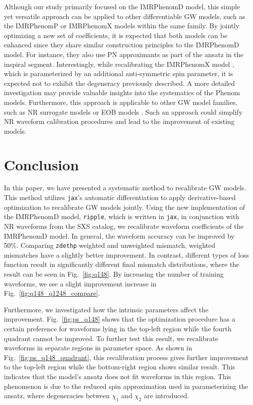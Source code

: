 \documentclass[twocolumn]{aastex631}
\newcommand{\ripple}{\texttt{ripple}}
\newcommand{\jax}{\texttt{jax}}
\newcommand{\zdethp}{\texttt{zdethp}}
\begin{document}
Although our study primarily focused on the IMRPhenomD model, this simple yet
versatile approach can be applied to other differentiable GW models, such as the
IMRPhenomP \citep{hannam2014simple} or IMRPhenomX \citep{pratten2020setting} 
models within the same family. By jointly optimizing a new set of coefficients,
it is expected that both models can be enhanced since they share similar
construction principles to the IMRPhenomD model. For instance, they also use PN
approximants as part of the ansatz in the inspiral segment. Interestingly, while
recalibrating the IMRPhenomX model \citep{pratten2020setting}, which is
parameterized by an additional anti-symmetric spin parameter, it is expected not
to exhibit the degeneracy previously described. A more detailed investigation
may provide valuable insights into the systematics of the Phenom models.
Furthermore, this approach is applicable to other GW model families, such as NR
surrogate models \citep{varma2019surrogate} or EOB models
\citep{taracchini2014effective}. Such an approach could simplify NR waveform
calibration procedures and lead to the improvement of existing models.


\section{Conclusion} \label{sec:conclusion}

In this paper, we have presented a systematic method to recalibrate GW models.
This method utilizes {\jax}'s automatic differentiation to apply
derivative-based optimization to recalibrate GW models jointly. Using the new
implementation of the IMRPhenomD model, {\ripple}, which is written in \jax, in
conjunction with NR waveforms from the SXS catalog, we recalibrate waveform
coefficients of the IMRPhenomD model. In general, the waveform accuracy can be
improved by 50\%. Comparing {\zdethp} weighted and unweighted mismatch, weighted
mismatches have a slightly better improvement. In contrast, different types of
loss function result in significantly different final mismatch distributions,
where the result can be seen in Fig.~\ref{fig:q148}. By increasing the number of
training waveforms, we see a slight improvement increase in
Fig.~\ref{fig:q148_q1248_compare}. 

Furthermore, we investigated how the intrinsic parameters affect the
improvement. Fig.~\ref{fig:ps_q148} shows that the optimization procedure has a
certain preference for waveforms lying in the top-left region while the fourth
quadrant cannot be improved. To further test this result, we recalibrate
waveforms in separate regions in parameter space. As shown in
Fig.~\ref{fig:ps_q148_quadrant}, this recalibration process gives further
improvement to the top-left region while the bottom-right region shows similar
result. This indicates that the model's ansatz does not fit waveforms in this region. This phenomenon is due to the reduced spin approximation used
in parameterizing the ansatz, where degeneracies between $\chi_1$ and $\chi_2$
are introduced. 
\end{document}
